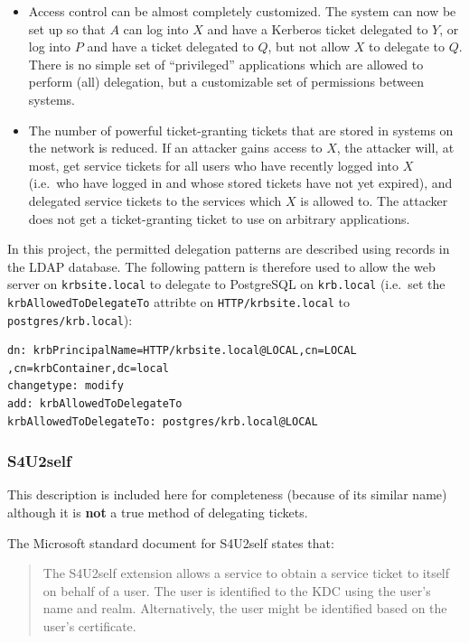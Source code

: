 \documentclass{article}
\begin{document}
\begin{itemize}
\item
  Access control can be almost completely customized. The system can now be set up so that $A$ can log into $X$ and have a Kerberos ticket delegated to $Y$, or log into $P$ and have a ticket delegated to $Q$, but not allow $X$ to delegate to $Q$. There is no simple set of ``privileged'' applications which are allowed to perform (all) delegation, but a customizable set of permissions between systems.
\item
  The number of powerful ticket-granting tickets that are stored in systems on the network is reduced. If an attacker gains access to $X$, the attacker will, at most, get service tickets for all users who have recently logged into $X$ (i.e.\ who have logged in and whose stored tickets have not yet expired), and delegated service tickets to the services which $X$ is allowed to. The attacker does not get a ticket-granting ticket to use on arbitrary applications.
\end{itemize}

In this project, the permitted delegation patterns are described using records in the LDAP database. The following pattern is therefore used to allow the web server on \verb+krbsite.local+ to delegate to PostgreSQL on \verb+krb.local+ (i.e.\ set the \texttt{krbAllowedToDelegateTo} attribte on \verb+HTTP/krbsite.local+ to \verb+postgres/krb.local+):

\begin{verbatim}
dn: krbPrincipalName=HTTP/krbsite.local@LOCAL,cn=LOCAL
,cn=krbContainer,dc=local
changetype: modify
add: krbAllowedToDelegateTo
krbAllowedToDelegateTo: postgres/krb.local@LOCAL
\end{verbatim}

\subsubsection{S4U2self}
This description is included here for completeness (because of its similar name) although it is \textbf{not} a true method of delegating tickets.

The Microsoft standard document for S4U2self\cite{MS-s4u2} states that:

\begin{quote}
  The S4U2self extension allows a service to obtain a service ticket to itself on behalf of a user. The user is identified to the KDC using the user's name and realm. Alternatively, the user might be identified based on the user's certificate.
\end{quote}
\end{document}
